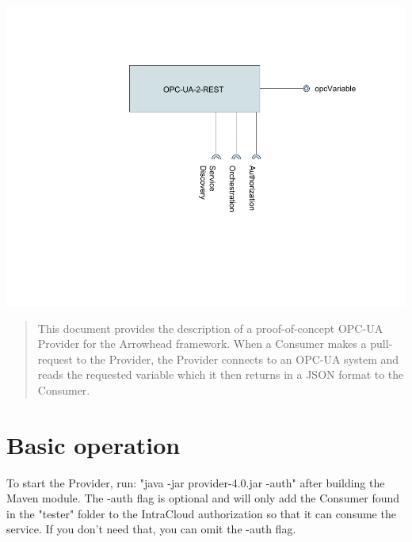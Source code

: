 \documentclass[a4paper]{arrowhead}
\begin{document}
\ArrowheadDate{\today}
\ArrowheadSetup

\begin{center}
  \vspace*{1cm}
  \LARGE{\arrowtitle}
  \vspace*{1cm}
  \vspace*{\fill}

  \includegraphics[scale=.6]{fig/OPC-2-REST_SysD.png}

  \vspace*{1cm}
  \vspace*{\fill}

  \begin{abstract}
    This document provides the description of a proof-of-concept OPC-UA Provider for the Arrowhead framework. When a Consumer makes a pull-request to the Provider, the Provider connects to an OPC-UA system and reads the requested variable which it then returns in a JSON format to the Consumer.
  \end{abstract}
\end{center}

\newpage

\section{Basic operation}
To start the Provider, run: "java -jar provider-4.0.jar -auth" after building the Maven module. The -auth flag is optional and will only add the Consumer found in the "tester" folder to the IntraCloud authorization so that it can consume the service. If you don't need that, you can omit the -auth flag.
\newline
\end{document}
